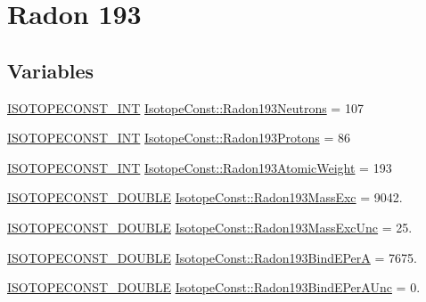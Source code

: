 \hypertarget{group___isotope_const-_radon-_rn193}{}\section{Radon 193}
\label{group___isotope_const-_radon-_rn193}
\subsection*{Variables}
\begin{DoxyCompactItemize}
\item 
\mbox{\hyperlink{group___isotope_const-_macros_ga5f18360b3e99483a35c32d789e62621c}{I\+S\+O\+T\+O\+P\+E\+C\+O\+N\+S\+T\+\_\+\+I\+NT}} \mbox{\hyperlink{group___isotope_const-_radon-_rn193_ga3db7c38534ae53acf747122594eab1a9}{Isotope\+Const\+::\+Radon193\+Neutrons}} = 107
\item 
\mbox{\hyperlink{group___isotope_const-_macros_ga5f18360b3e99483a35c32d789e62621c}{I\+S\+O\+T\+O\+P\+E\+C\+O\+N\+S\+T\+\_\+\+I\+NT}} \mbox{\hyperlink{group___isotope_const-_radon-_rn193_ga95620ec9718feb7e9ee83ee0dd991903}{Isotope\+Const\+::\+Radon193\+Protons}} = 86
\item 
\mbox{\hyperlink{group___isotope_const-_macros_ga5f18360b3e99483a35c32d789e62621c}{I\+S\+O\+T\+O\+P\+E\+C\+O\+N\+S\+T\+\_\+\+I\+NT}} \mbox{\hyperlink{group___isotope_const-_radon-_rn193_ga422ad8e9bb0dd874ef5562251d9c9250}{Isotope\+Const\+::\+Radon193\+Atomic\+Weight}} = 193
\item 
\mbox{\hyperlink{group___isotope_const-_macros_ga8f45a7272ce02c0b4c65c44636ed719a}{I\+S\+O\+T\+O\+P\+E\+C\+O\+N\+S\+T\+\_\+\+D\+O\+U\+B\+LE}} \mbox{\hyperlink{group___isotope_const-_radon-_rn193_gaa83a4fada845935d36f14df1e8aa797a}{Isotope\+Const\+::\+Radon193\+Mass\+Exc}} = 9042.
\item 
\mbox{\hyperlink{group___isotope_const-_macros_ga8f45a7272ce02c0b4c65c44636ed719a}{I\+S\+O\+T\+O\+P\+E\+C\+O\+N\+S\+T\+\_\+\+D\+O\+U\+B\+LE}} \mbox{\hyperlink{group___isotope_const-_radon-_rn193_ga83489061892fc2a1e3d3b921d3721558}{Isotope\+Const\+::\+Radon193\+Mass\+Exc\+Unc}} = 25.
\item 
\mbox{\hyperlink{group___isotope_const-_macros_ga8f45a7272ce02c0b4c65c44636ed719a}{I\+S\+O\+T\+O\+P\+E\+C\+O\+N\+S\+T\+\_\+\+D\+O\+U\+B\+LE}} \mbox{\hyperlink{group___isotope_const-_radon-_rn193_gae59c2c5b4ebc4e77d295edb4b268e3a5}{Isotope\+Const\+::\+Radon193\+Bind\+E\+PerA}} = 7675.
\item 
\mbox{\hyperlink{group___isotope_const-_macros_ga8f45a7272ce02c0b4c65c44636ed719a}{I\+S\+O\+T\+O\+P\+E\+C\+O\+N\+S\+T\+\_\+\+D\+O\+U\+B\+LE}} \mbox{\hyperlink{group___isotope_const-_radon-_rn193_ga3936c7c8f55a7504aae9fed770541e2a}{Isotope\+Const\+::\+Radon193\+Bind\+E\+Per\+A\+Unc}} = 0.

\end{DoxyCompactItemize}
